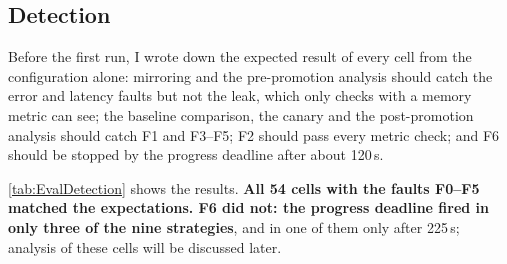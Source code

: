 \subsection{Detection}
\label{sec:EvalDetection}
Before the first run, I wrote down the expected result of every cell from the configuration alone: mirroring and the pre-promotion analysis should catch the error and latency faults but not the leak, which only checks with a memory metric can see; the baseline comparison, the canary and the post-promotion analysis should catch F1 and F3--F5; F2 should pass every metric check; and F6 should be stopped by the progress deadline after about 120\,s.

\autoref{tab:EvalDetection} shows the results. \textbf{All 54 cells with the faults F0--F5 matched the expectations. F6 did not: the progress deadline fired in only three of the nine strategies}, and in one of them only after 225\,s; analysis of these cells will be discussed later.

